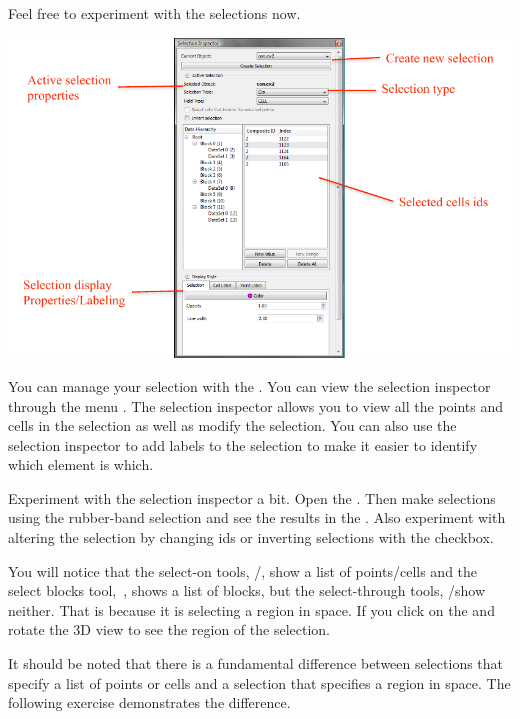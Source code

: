 Feel free to experiment with the selections now.

\begin{inlinefig}
  \includegraphics{images/SelectionInspector}
\end{inlinefig}

You can manage your selection with the .  You
can view the selection inspector through the menu  \ra
{}.  The selection inspector allows you to view all
the points and cells in the selection as well as modify the selection.  You
can also use the selection inspector to add labels to the selection to make
it easier to identify which element is which.

Experiment with the selection inspector a bit.  Open the .  Then make selections using the rubber-band selection and see
the results in the .  Also experiment with
altering the selection by changing ids or inverting selections with the
 checkbox.

You will notice that the select-on tools, \selectCellsOn/\selectPointsOn,
show a list of points/cells and the select blocks tool,~\selectBlocks,
shows a list of blocks, but the select-through tools,
\selectCellsThrough/\selectPointsThrough show neither.  That is because it
is selecting a region in space.  If you click on the  and
rotate the 3D view to see the region of the selection.

It should be noted that there is a fundamental difference between
selections that specify a list of points or cells and a selection that
specifies a region in space.  The following exercise demonstrates the
difference.

